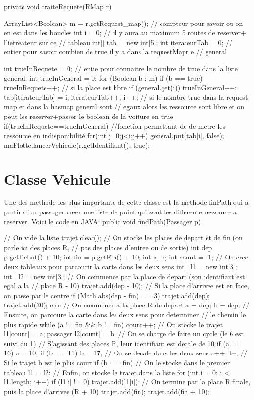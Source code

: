 \documentclass[a4paper, titlepage]{report}
\begin{document}
private void traiteRequete(RMap r) {
		ArrayList<Boolean> m = r.getRequest_map();
		// compteur pour savoir ou on en est dans les boucles
		int i = 0;
		// il y aura au maximum 5 routes de reserver+ l'ietreateur sur ce
		// tableau
		int[] tab = new int[5];
		int iterateurTab = 0;
		// entier pour savoir combien de true il y a dans la requestMapr e
		// general

		int trueInRequete = 0;
		// entie pour connaitre le nombre de true dans la liste general;
		int trueInGeneral = 0;
		for (Boolean b : m) {
			if (b == true) {
				trueInRequete++;
				// si la place est libre
				if (general.get(i)) {
					trueInGeneral++;
					tab[iterateurTab] = i;
					iterateurTab++;
				}
			}
			i++;
		}
		// si le nombre true dans la request map et dans la hasmap general sont
		// egaux alors les ressource sont libre et on peut les reserver+passer le boolean de la voiture en true
		if(trueInRequete==trueInGeneral){
			//fonction permettant de de metre les ressource en indisponibilité
			for(int j=0;j<i;j++){
				general.put(tab[i], false);
			}
			maFlotte.lancerVehicule(r.getIdentifiant(), true);	
		}

	}

\section{Classe Vehicule}
Une des methode les plus importante de cette classe est la methode finPath qui a partir d'un passager creer une liste de point qui sont les differente ressource a reserver. Voici le code en JAVA:
public void findPath(Passager p) {
		// On vide la liste
		trajet.clear();
		// On stocke les places de depart et de fin (on parle ici des places R,
		// pas des places d'entree ou de sortie)
		int dep = p.getDebut() + 10;
		int fin = p.getFin() + 10;
		int a, b;
		int count = -1;
		// On cree deux tableaux pour parcourir la carte dans les deux sens
		int[] l1 = new int[3];
		int[] l2 = new int[3];
		// On commence par la place de depart (son identifiant est egal a la
		// place R - 10)
		trajet.add(dep - 10);
		// Si la place d'arrivee est en face, on passe par le centre
		if (Math.abs(dep - fin) == 3) {
			trajet.add(dep);
			trajet.add(30);
		} else {
			// On commence a la place R de depart
			a = dep;
			b = dep;
			// Ensuite, on parcoure la carte dans les deux sens pour determiner
			// le chemin le plus rapide
			while (a != fin && b != fin) {
				count++;
				// On stocke le trajet
				l1[count] = a;
	passager			l2[count] = b;
				// On se charge de faire un cycle (le 6 est suivi du 1)
				// S'agissant des places R, leur identifiant est decale de 10
				if (a == 16) {
					a = 10;
				}
				if (b == 11) {
					b = 17;
				}
				// On se decale dans les deux sens
				a++;
				b--;
			}// Si le trajet b est le plus court
			if (b == fin) {
				// On le stocke dans le premier tableau
				l1 = l2;
			}// Enfin, on stocke le trajet dans la liste
			for (int i = 0; i < l1.length; i++) {
				if (l1[i] != 0) {
					trajet.add(l1[i]);
				}
			}
		}
		// On termine par la place R finale, puis la place d'arrivee (R + 10)
		trajet.add(fin);
		trajet.add(fin + 10);
		
	}
\end{document}
